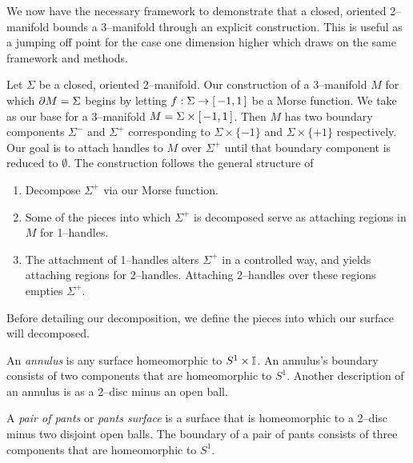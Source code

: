 \label{sec:2bound3}

%		


We now have the necessary framework to demonstrate that a closed, oriented 2--manifold bounds a 3--manifold through an explicit construction.
This is useful as a jumping off point for the case one dimension higher which draws on the same framework and methods.

Let $\Sigma$ be a closed, oriented 2--manifold.
Our construction of a 3--manifold $M$ for which $\partial M=\Sigma$ begins by letting $f:\Sigma\to[\,-1,1\,]$ be a Morse function.
We take as our base for a 3--manifold $M=\Sigma\times[\,-1,1\,]$.
Then $M$ has two boundary components $\Sigma^-$ and $\Sigma^+$ corresponding to $\Sigma\times\{-1\}$ and $\Sigma\times\{+1\}$ respectively.
Our goal is to attach handles to $M$ over $\Sigma^+$ until that boundary component is reduced to $\emptyset$.
The construction follows the general structure of
\begin{enumerate}
	\item Decompose $\Sigma^+$ via our Morse function.
	\item Some of the pieces into which $\Sigma^+$ is decomposed serve as attaching regions in $M$ for 1--handles.
	\item The attachment of 1--handles alters $\Sigma^+$ in a controlled way, and yields attaching regions for 2--handles.  Attaching 2--handles over these regions empties $\Sigma^+$.
\end{enumerate}

Before detailing our decomposition, we define the pieces into which our surface will decomposed.

\begin{defn}
	\label{def:annulus}
	An \emph{annulus} is any surface homeomorphic to $S^1\times\mathbb{I}$.
	An annulus's boundary consists of two components that are homeomorphic to $S^1$.
	Another description of an annulus is as a 2--disc minus an open ball.
\end{defn}

\begin{defn}
	\label{def:pants}
	A \emph{pair of pants} or \emph{pants surface} is a surface that is homeomorphic to a 2--disc minus two disjoint open balls.
	The boundary of a pair of pants consists of three components that are homeomorphic to $S^1$.
\end{defn}

